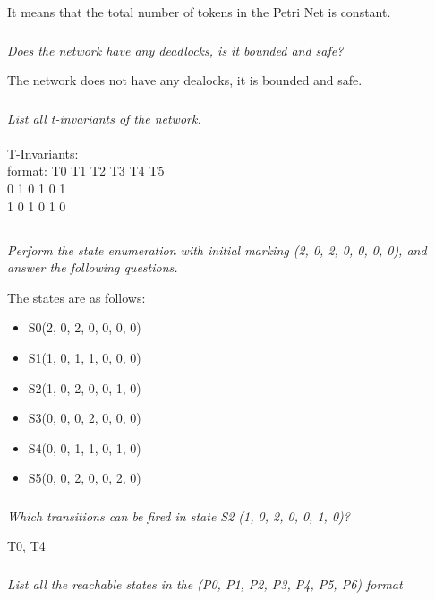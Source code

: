 \documentclass[letterpaper]{article}
\begin{document}
It means that the total number of tokens in the Petri Net is constant.

\subsubsection{}
\textit{Does the network have any deadlocks, is it bounded and safe?}

The network does not have any dealocks, it is bounded and safe.

\subsubsection{}
\textit{List all t-invariants of the network.}\\ \\
T-Invariants: \\
format: T0 T1 T2 T3 T4 T5 \\
0 1 0 1 0 1 \\
1 0 1 0 1 0 \\

\subsection{}
\textit{Perform the state enumeration with initial marking (2, 0, 2, 0, 0, 0, 0), and answer the following questions.}

The states are as follows:
\begin{itemize}
 \item S0(2, 0, 2, 0, 0, 0, 0)
 \item S1(1, 0, 1, 1, 0, 0, 0)
 \item S2(1, 0, 2, 0, 0, 1, 0)
 \item S3(0, 0, 0, 2, 0, 0, 0)
 \item S4(0, 0, 1, 1, 0, 1, 0)
 \item S5(0, 0, 2, 0, 0, 2, 0)
\end{itemize}

\subsubsection{}
\textit{Which transitions can be fired in state S2 (1, 0, 2, 0, 0, 1, 0)?}

T0, T4

\subsubsection{}
\textit{List all the reachable states in the (P0, P1, P2, P3, P4, P5, P6) format}
\end{document}
